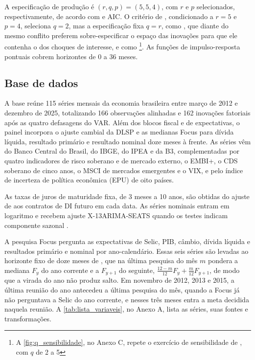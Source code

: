 \documentclass[preprint,authoryear,review,12pt]{elsarticle}
\begin{document}
A especificação de produção é $(r, q, p) = (5, 5, 4)$, com $r$ e $p$ selecionados, respectivamente, de acordo com \cite{bai-ng} e AIC. O critério de \cite{amengual2007consistent}, condicionado a $r = 5$ e $p = 4$, seleciona $q = 2$, mas a especificação fixa $q = r$, como \cite{STOCK2016415}, que diante do mesmo conflito preferem sobre-especificar o espaço das inovações para que ele contenha o dos choques de interesse, e como \cite{alessi}\footnote{A \autoref{fig:q_sensibilidade}, no Anexo C, repete o exercício de sensibilidade de \cite{alessi}, com $q$ de 2 a 5}. As funções de impulso-resposta pontuais cobrem horizontes de 0 a 36 meses.

\subsection{Base de dados}
\label{sec:dados}

A base reúne 115 séries mensais da economia brasileira entre março de 2012 e dezembro de 2025, totalizando 166 observações alinhadas e 162 inovações fatoriais após as quatro defasagens do VAR. Além dos blocos fiscal e de expectativas, o painel incorpora o ajuste cambial da DLSP e as medianas Focus para dívida líquida, resultado primário e resultado nominal doze meses à frente. As séries vêm do Banco Central do Brasil, do IBGE, do IPEA e da B3, complementadas por quatro indicadores de risco soberano e de mercado externo, o EMBI+, o CDS soberano de cinco anos, o MSCI de mercados emergentes e o VIX, e pelo índice de incerteza de política econômica (EPU) de oito países.

As taxas de juros de maturidade fixa, de 3 meses a 10 anos, são obtidas do ajuste de \cite{svensson1994estimating} aos contratos de DI futuro em cada data. As séries nominais entram em logaritmo e recebem ajuste X-13ARIMA-SEATS quando os testes indicam componente sazonal \cite{sax2018seasonal}.

A pesquisa Focus pergunta as expectativas de Selic, PIB, câmbio, dívida líquida e resultados primário e nominal por ano-calendário. Essas seis séries são levadas ao horizonte fixo de doze meses de \cite{dovern2012}, que na última pesquisa do mês $m$ pondera a mediana $F_y$ do ano corrente e a $F_{y+1}$ do seguinte, $\frac{12-m}{12} F_{y} + \frac{m}{12} F_{y+1}$, de modo que a virada do ano não produz salto. Em novembro de 2012, 2013 e 2015, a última reunião do ano antecedeu a última pesquisa do mês, quando a Focus já não perguntava a Selic do ano corrente, e nesses três meses entra a meta decidida naquela reunião. A \autoref{tab:lista_variaveis}, no Anexo A, lista as séries, suas fontes e transformações.
\end{document}
